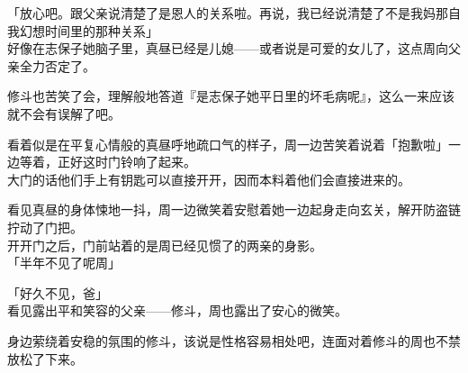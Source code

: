 「放心吧。跟父亲说清楚了是恩人的关系啦。再说，我已经说清楚了不是我妈那自我幻想时间里的那种关系」\\

好像在志保子她脑子里，真昼已经是儿媳——或者说是可爱的女儿了，这点周向父亲全力否定了。

修斗也苦笑了会，理解般地答道『是志保子她平日里的坏毛病呢』，这么一来应该就不会有误解了吧。

%  


看着似是在平复心情般的真昼呼地疏口气的样子，周一边苦笑着说着「抱歉啦」一边等着，正好这时门铃响了起来。\\

大门的话他们手上有钥匙可以直接开开，因而本料着他们会直接进来的。

看见真昼的身体悚地一抖，周一边微笑着安慰着她一边起身走向玄关，解开防盗链拧动了门把。\\

开开门之后，门前站着的是周已经见惯了的两亲的身影。\\

「半年不见了呢周」

「好久不见，爸」\\

看见露出平和笑容的父亲——修斗，周也露出了安心的微笑。

身边萦绕着安稳的氛围的修斗，该说是性格容易相处吧，连面对着修斗的周也不禁放松了下来。\\

